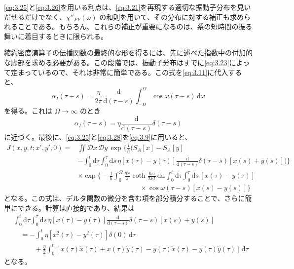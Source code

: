 \eqref{eq:3.25}と\eqref{eq:3.26}を用いる利点は、\eqref{eq:3.21}を再現する適切な振動子分布を見いだせるだけでなく、$\chi''_{FF}(\omega)$ の和則を用いて、その分布に対する補正も求められることである。もちろん、これらの補正が重要になるのは、系の短時間の振る舞いに着目するときに限られる\cite{ref24}。

縮約密度演算子の伝播関数の最終的な形を得るには、先に述べた指数中の付加的な虚部を求める必要がある。この段階では、振動子分布はすでに\eqref{eq:3.23}によって定まっているので、それは非常に簡単である。この式を\eqref{eq:3.11}に代入すると、
\begin{equation}
\alpha_I(\tau-s)=\frac{\eta}{2\pi}\frac{\mathrm d}{\mathrm d(\tau-s)}
\int_{-\Omega}^{\Omega}\cos\omega(\tau-s)\,\mathrm d\omega
\tag{3.28}\label{eq:3.28}
\end{equation}
を得る。これは $\Omega\to\infty$ のとき
\begin{equation}
\alpha_I(\tau-s)=\eta\frac{\mathrm d}{\mathrm d(\tau-s)}\delta(\tau-s)
\tag{3.29}\label{eq:3.29}
\end{equation}
に近づく。最後に、\eqref{eq:3.25}と\eqref{eq:3.28}を\eqref{eq:3.9}に用いると、
\begin{equation}
\begin{aligned}
J(x,y,t;x',y',0)
={}&\iint\mathcal D x\,\mathcal D y\,
\exp\biggl\{\frac{\mathrm i}{\hbar}\biggl(
S_A[x]-S_A[y]\\
&-\int_0^t\!\mathrm d\tau\int_0^\tau\!\mathrm ds\,
\eta[x(\tau)-y(\tau)]
\frac{\mathrm d}{\mathrm d(\tau-s)}\delta(\tau-s)[x(s)+y(s)]
\biggr)\biggr\}\\
&\times\exp\biggl\{-\frac{1}{\hbar}\int_0^\Omega
\frac{\eta\omega}{\pi}\coth\frac{\hbar\omega}{2kT}\,
\mathrm d\omega\int_0^t\!\mathrm d\tau\int_0^\tau\!\mathrm ds\,
[x(\tau)-y(\tau)]\\
&\hspace{9em}\times\cos\omega(\tau-s)[x(s)-y(s)]\biggr\}
\end{aligned}
\tag{3.30}\label{eq:3.30}
\end{equation}
となる。この式は、デルタ関数の微分を含む項を部分積分することで、さらに簡単にできる。計算は直接的であり、結果は
\begin{equation}
\begin{aligned}
&\int_0^t\!\mathrm d\tau\int_0^\tau\!\mathrm ds\,
\eta[x(\tau)-y(\tau)]\frac{\mathrm d}{\mathrm d(\tau-s)}
\delta(\tau-s)[x(s)+y(s)]\\
&\quad=-\int_0^t\eta[x^2(\tau)-y^2(\tau)]\delta(0)\,\mathrm d\tau\\
&\qquad\quad+\frac{\eta}{2}\int_0^t
[x(\tau)\dot x(\tau)+x(\tau)\dot y(\tau)
-y(\tau)\dot x(\tau)-y(\tau)\dot y(\tau)]\,\mathrm d\tau
\end{aligned}
\tag{3.31}\label{eq:3.31}
\end{equation}
となる。

